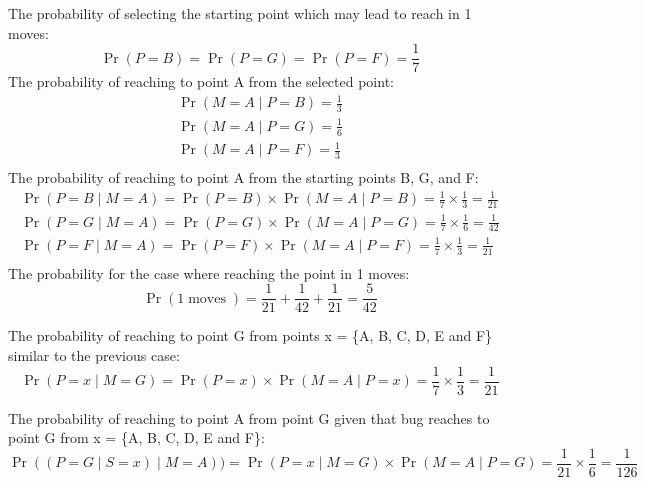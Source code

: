 \documentclass{article}
\DeclareMathOperator{\CondProb}{Pr}
\DeclareMathOperator{\moves}{moves}
\begin{document}
The probability of selecting the starting point which may lead to reach in 1 moves:
\begin{equation*}
	\CondProb{(P = B)} = \CondProb{(P = G)} = \CondProb{(P = F)} = \frac{1}{7}
\end{equation*}
The probability of reaching to point A from the selected point:
\begin{equation*}
	\begin{aligned}
	\CondProb{(M = A \mid P = B)} = \frac{1}{3} \\
	\CondProb{(M = A \mid P = G)} = \frac{1}{6} \\
	\CondProb{(M = A \mid P = F)} = \frac{1}{3} \\
	\end{aligned}
\end{equation*}
The probability of reaching to point A from the starting points B, G, and F:
\begin{equation*}
	\begin{aligned}
	\CondProb{(P = B \mid M = A)} = \CondProb{(P = B)}\times\CondProb{(M = A \mid P = B)} = \frac{1}{7}\times\frac{1}{3}  = \frac{1}{21}  \\
	\CondProb{(P = G \mid M = A)} = \CondProb{(P = G)}\times\CondProb{(M = A \mid P = G)} = \frac{1}{7}\times\frac{1}{6}  = \frac{1}{42}  \\
	\CondProb{(P = F \mid M = A)} = \CondProb{(P = F)}\times\CondProb{(M = A \mid P = F)} = \frac{1}{7}\times\frac{1}{3}  = \frac{1}{21}  \\
	\end{aligned}
\end{equation*}
The probability for the case where reaching the point in 1 moves:
\begin{equation*}
	\CondProb{(1 \moves)} =  \frac{1}{21} +  \frac{1}{42} + \frac{1}{21} =  \frac{5}{42}
\end{equation*}

The probability of reaching to point G from points x = \{A, B, C, D, E and F\} similar to the previous case:
\begin{equation*}
	\CondProb{(P = x \mid M = G)} =  \CondProb{(P = x)}\times\CondProb{(M = A \mid P = x)} = \frac{1}{7}\times\frac{1}{3}  = \frac{1}{21} 
\end{equation*}

The probability of reaching to point A from point G given that bug reaches to point G from x = \{A, B, C, D, E and F\}:
\begin{equation} \label{eq:solve1}
	\CondProb{((P = G \mid S = x) \mid M = A))} = \CondProb{(P = x \mid M = G)}\times\CondProb{(M = A \mid P = G)} = \frac{1}{21}\times\frac{1}{6}  = \frac{1}{126} 
\end{equation}
\end{document}
